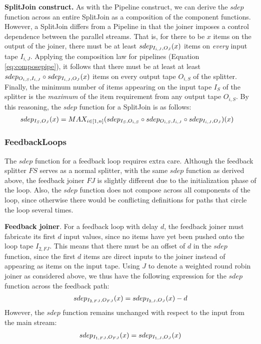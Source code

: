 {\bf SplitJoin construct.}  As with the Pipeline construct, we can
derive the $sdep$ function across an entire SplitJoin as a composition
of the component functions.  However, a SplitJoin differs from a
Pipeline in that the joiner imposes a control dependence between the
parallel streams.  That is, for there to be $x$ items on the output of
the joiner, there must be at least $sdep_{I_{i,J}, O_J}(x)$ items on {\it
every} input tape $I_{i,J}$.  Applying the composition law for pipelines
(Equation \ref{eq:composepipe}), it follows that there must be at
least at least $sdep_{O_{i,S}, I_{i,J}} \circ sdep_{I_{i,J}, O_J}(x)$ items on
every output tape $O_{i,S}$ of the splitter.  Finally, the minimum number
of items appearing on the input tape $I_S$ of the splitter is the {\it
maximum} of the item requirement from any output tape $O_{i,S}$.  By this
reasoning, the $sdep$ function for a SplitJoin is as follows:
\begin{align}
sdep_{I_S, O_J}(x) &= MAX_{i \in [1,n]}(sdep_{I_S, O_{i,S}} \circ
sdep_{O_{i,S}, I_{i,J}} \circ sdep_{I_{i,J}, O_J})(x)
\end{align}

\subsubsection{FeedbackLoops}
\label{sec:timefl}

The $sdep$ function for a feedback loop requires extra care. Although
the feedback splitter $FS$ serves as a normal splitter, with the same
$sdep$ function as derived above, the feedback joiner $FJ$ is slightly
different due to the initialization phase of the loop.  Also, the
$sdep$ function does not compose across all components of the loop,
since otherwise there would be conflicting definitions for paths that
circle the loop several times.

{\bf Feedback joiner}.  For a feedback loop with delay $d$, the
feedback joiner must fabricate its first $d$ input values, since no
items have yet been pushed onto the loop tape $I_{2,FJ}$.  This means
that there must be an offset of $d$ in the $sdep$ function, since the
first $d$ items are direct inputs to the joiner instead of appearing
as items on the input tape.  Using $J$ to denote a weighted round
robin joiner as considered above, we thus have the following
expression for the $sdep$ function across the feedback path:
\begin{align*}
sdep_{I_{2,FJ}, O_{FJ}}(x) = sdep_{I_{2,J}, O_J}(x) - d
\end{align*}
However, the $sdep$ function remains unchanged with respect to the
input from the main stream:
\begin{align*}
sdep_{I_{1,FJ}, O_{FJ}}(x) = sdep_{I_{1,J}, O_J}(x)
\end{align*}


